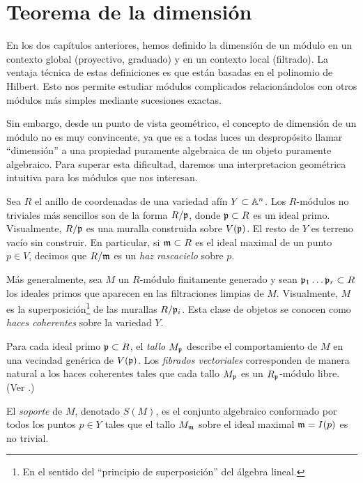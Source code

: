 \chapter{Teorema de la dimensión}

\noindent En los dos capítulos anteriores, hemos definido la dimensión de un módulo en un contexto global (proyectivo, graduado) y en un contexto local (filtrado). La ventaja técnica de estas definiciones es que están basadas en el polinomio de Hilbert. Esto nos permite estudiar módulos complicados relacionándolos con otros módulos más simples mediante sucesiones exactas.

Sin embargo, desde un punto de vista geométrico, el concepto de dimensión de un módulo no es muy convincente, ya que es a todas luces un despropósito llamar ``dimensión'' a una propiedad puramente algebraica de un objeto puramente algebraico. Para superar esta dificultad, daremos una interpretacion geométrica intuitiva para los módulos que nos interesan.

Sea $R$ el anillo de coordenadas de una variedad afín $Y \subset \mathbb A^n$. Los $R$-módulos no triviales más sencillos son de la forma $R/\mathfrak p$, donde $\mathfrak p \subset R$ es un ideal primo. Visualmente, $R/\mathfrak p$ es una muralla construida sobre $V(\mathfrak p)$. El resto de $Y$ es terreno vacío sin construir. En particular, si $\mathfrak m \subset R$ es el ideal maximal de un punto $p \in V$, decimos que $R/\mathfrak m$ es un \textit{haz rascacielo} sobre $p$.

Más generalmente, sea $M$ un $R$-módulo finitamente generado y sean $\mathfrak p_1 \dots \mathfrak p_r \subset R$ los ideales primos que aparecen en las filtraciones limpias de $M$. Visualmente, $M$ es la superposición\footnote{En el sentido del ``principio de superposición'' del álgebra lineal.} de las murallas $R/\mathfrak p_i$. Esta clase de objetos se conocen como \textit{haces coherentes} sobre la variedad $Y$.

Para cada ideal primo $\mathfrak p \subset R$, el \textit{tallo} $M_\mathfrak p$ describe el comportamiento de $M$ en una vecindad genérica de $V(\mathfrak p)$. Los \textit{fibrados vectoriales} corresponden de manera natural a los haces coherentes tales que cada tallo $M_\mathfrak p$ es un $R_\mathfrak p$-módulo libre. (Ver \cite[p. 291]{gortz}.)

\begin{definition}
El \textit{soporte} de $M$, denotado $S(M)$, es el conjunto algebraico conformado por todos los puntos $p \in Y$ tales que el tallo $M_\mathfrak m$ sobre el ideal maximal $\mathfrak m = I(p)$ es no trivial.
\end{definition}

